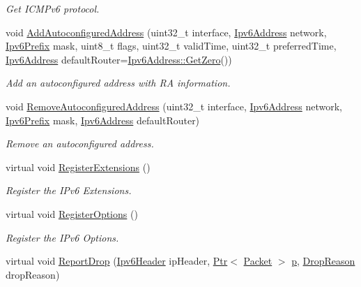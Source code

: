 \begin{DoxyCompactItemize}
\begin{DoxyCompactList}\small\item\em Get I\+C\+M\+Pv6 protocol. \end{DoxyCompactList}\item 
void \hyperlink{classns3_1_1Ipv6L3Protocol_a1806de87b35929a2181c2985e5df1ec0}{Add\+Autoconfigured\+Address} (uint32\+\_\+t interface, \hyperlink{classns3_1_1Ipv6Address}{Ipv6\+Address} network, \hyperlink{classns3_1_1Ipv6Prefix}{Ipv6\+Prefix} mask, uint8\+\_\+t flags, uint32\+\_\+t valid\+Time, uint32\+\_\+t preferred\+Time, \hyperlink{classns3_1_1Ipv6Address}{Ipv6\+Address} default\+Router=\hyperlink{classns3_1_1Ipv6Address_a63a34bdb1505e05fbdd07d316d0bd7e6}{Ipv6\+Address\+::\+Get\+Zero}())
\begin{DoxyCompactList}\small\item\em Add an autoconfigured address with RA information. \end{DoxyCompactList}\item 
void \hyperlink{classns3_1_1Ipv6L3Protocol_a6e8db427dbb1dfcaeecee8a6d793e94a}{Remove\+Autoconfigured\+Address} (uint32\+\_\+t interface, \hyperlink{classns3_1_1Ipv6Address}{Ipv6\+Address} network, \hyperlink{classns3_1_1Ipv6Prefix}{Ipv6\+Prefix} mask, \hyperlink{classns3_1_1Ipv6Address}{Ipv6\+Address} default\+Router)
\begin{DoxyCompactList}\small\item\em Remove an autoconfigured address. \end{DoxyCompactList}\item 
virtual void \hyperlink{classns3_1_1Ipv6L3Protocol_a25cb7eac8f79c3461ec50b8464db2f8f}{Register\+Extensions} ()
\begin{DoxyCompactList}\small\item\em Register the I\+Pv6 Extensions. \end{DoxyCompactList}\item 
virtual void \hyperlink{classns3_1_1Ipv6L3Protocol_ac9c52b73b294e0b592a5034b87278d92}{Register\+Options} ()
\begin{DoxyCompactList}\small\item\em Register the I\+Pv6 Options. \end{DoxyCompactList}\item 
virtual void \hyperlink{classns3_1_1Ipv6L3Protocol_a65592c538120dd1b628727c1fae71bcf}{Report\+Drop} (\hyperlink{classns3_1_1Ipv6Header}{Ipv6\+Header} ip\+Header, \hyperlink{classns3_1_1Ptr}{Ptr}$<$ \hyperlink{classns3_1_1Packet}{Packet} $>$ \hyperlink{lte__link__budget__x2__handover__measures_8m_ac9de518908a968428863f829398a4e62}{p}, \hyperlink{classns3_1_1Ipv6L3Protocol_a33c64db9bc35f71ff368b132bfffa37a}{Drop\+Reason} drop\+Reason)

\end{DoxyCompactItemize}
